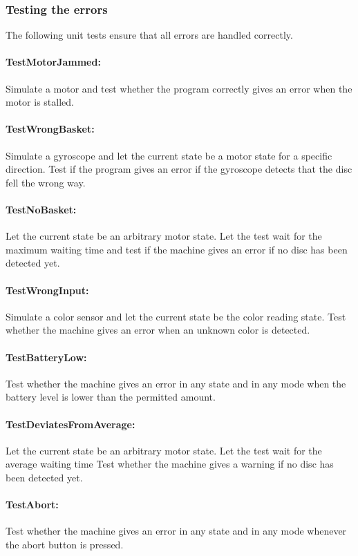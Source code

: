 \documentclass[a4paper,oneside,11pt]{article}
\begin{document}
\subsubsection{Testing the errors}
The following unit tests ensure that all errors are handled correctly.

\paragraph{TestMotorJammed:}
Simulate a motor and test whether the program correctly gives an error when the motor is stalled.

\paragraph{TestWrongBasket:}
Simulate a gyroscope and let the current state be a motor state for a specific direction. Test if the program gives an error if the gyroscope detects that the disc fell the wrong way.

\paragraph{TestNoBasket:}
Let the current state be an arbitrary motor state. Let the test wait for the maximum waiting time and test if the machine gives an error if no disc has been detected yet.

\paragraph{TestWrongInput:}
Simulate a color sensor and let the current state be the color reading state. Test whether the machine gives an error when an unknown color is detected.

\paragraph{TestBatteryLow:}
Test whether the machine gives an error in any state and in any mode when the battery level is lower than the permitted amount.

\paragraph{TestDeviatesFromAverage:}
Let the current state be an arbitrary motor state. Let the test wait for the average waiting time Test whether the machine gives a warning if no disc has been detected yet.

\paragraph{TestAbort:}
Test whether the machine gives an error in any state and in any mode whenever the abort button is pressed.
\end{document}
